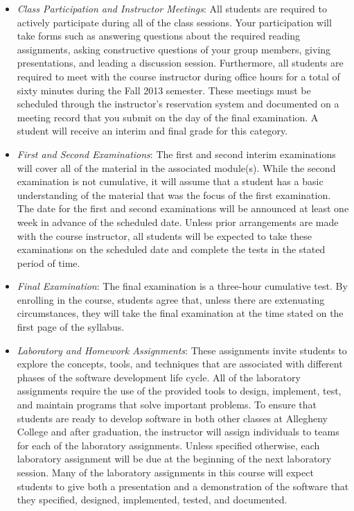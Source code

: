 \begin{itemize}

	\item {\em Class Participation and Instructor Meetings}: All students are required to actively participate during
		all of the class sessions. Your participation will take forms such as answering questions about the required
		reading assignments, asking constructive questions of your group members, giving presentations, and leading a
		discussion session. Furthermore, all students are required to meet with the course instructor during office
		hours for a total of sixty minutes during the Fall 2013 semester.  These meetings must be scheduled through the
		instructor's reservation system and documented on a meeting record that you submit on the day of the final
		examination. A student will receive an interim and final grade for this category.

	\item {\em First and Second Examinations}: The first and second interim examinations will cover all of the material
		in the associated module(s).  While the second examination is not cumulative, it will assume that a student has a
		basic understanding of the material that was the focus of the first examination.  The date for the first and
		second examinations will be announced at least one week in advance of the scheduled date.  Unless prior
		arrangements are made with the course instructor, all students will be expected to take these examinations on the
		scheduled date and complete the tests in the stated period of time.

	\item {\em Final Examination}: The final examination is a three-hour cumulative test.  By enrolling in the course,
		students agree that, unless there are extenuating circumstances, they will take the final examination at the
		time stated on the first page of the syllabus.

	\item {\em Laboratory and Homework Assignments}: These assignments invite students to explore the concepts, tools,
		and techniques that are associated with different phases of the software development life cycle.  All of the
		laboratory assignments require the use of the provided tools to design, implement, test, and maintain programs
		that solve important problems.  To ensure that students are ready to develop software in both other classes at
		Allegheny College and after graduation, the instructor will assign individuals to teams for each of the
		laboratory assignments.  Unless specified otherwise, each laboratory assignment will be due at the beginning of
		the next laboratory session.  Many of the laboratory assignments in this course will expect students to
		give both a presentation and a demonstration of the software that they specified, designed, implemented, tested,
		and documented.  
	

\end{itemize}
